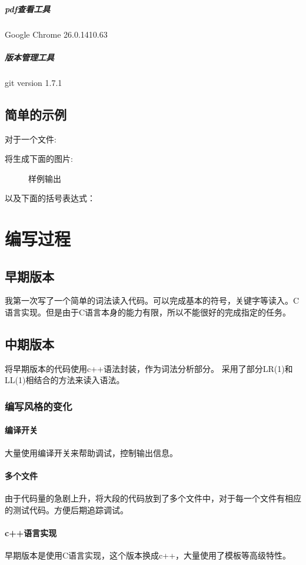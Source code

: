 \documentclass[12pt,a4paper]{ctexrep}
\begin{document}
\paragraph{pdf查看工具}
Google Chrome 26.0.1410.63
\paragraph{版本管理工具}
git version 1.7.1
\section{简单的示例}
对于一个文件:

\par 将生成下面的图片:
\begin{figure}[h]

\caption{样例输出}
\label{样例输出1}
\end{figure}
\par 以及下面的括号表达式：

\chapter{编写过程}
\section{早期版本}
我第一次写了一个简单的词法读入代码。可以完成基本的符号，关键字等读入。C语言实现。但是由于C语言本身的能力有限，所以不能很好的完成指定的任务。
\section{中期版本}
将早期版本的代码使用c++语法封装，作为词法分析部分。
采用了部分LR(1)和LL(1)相结合的方法来读入语法。
\subsection{编写风格的变化}
\subsubsection{编译开关}
	大量使用编译开关来帮助调试，控制输出信息。

\subsubsection{多个文件}
	由于代码量的急剧上升，将大段的代码放到了多个文件中，对于每一个文件有相应的测试代码。方便后期追踪调试。
\subsubsection{c++语言实现}
	早期版本是使用C语言实现，这个版本换成c++，大量使用了模板等高级特性。
\end{document}
